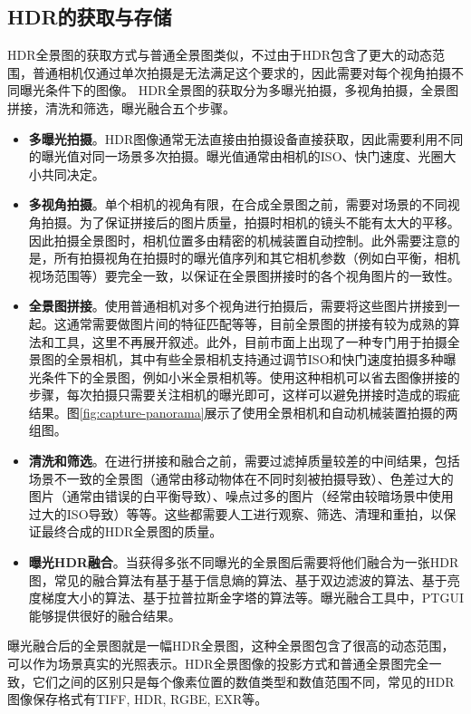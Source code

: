 \subsection{HDR的获取与存储}
HDR全景图的获取方式与普通全景图类似，不过由于HDR包含了更大的动态范围，普通相机仅通过单次拍摄是无法满足这个要求的，因此需要对每个视角拍摄不同曝光条件下的图像。
HDR全景图的获取分为多曝光拍摄，多视角拍摄，全景图拼接，清洗和筛选，曝光融合五个步骤。
\begin{itemize}
    \item \textbf{多曝光拍摄}。HDR图像通常无法直接由拍摄设备直接获取，因此需要利用不同的曝光值对同一场景多次拍摄。曝光值通常由相机的ISO、快门速度、光圈大小共同决定。
    \item \textbf{多视角拍摄}。单个相机的视角有限，在合成全景图之前，需要对场景的不同视角拍摄。为了保证拼接后的图片质量，拍摄时相机的镜头不能有太大的平移。因此拍摄全景图时，相机位置多由精密的机械装置自动控制。此外需要注意的是，所有拍摄视角在拍摄时的曝光值序列和其它相机参数（例如白平衡，相机视场范围等）要完全一致，以保证在全景图拼接时的各个视角图片的一致性。
    \item \textbf{全景图拼接}。使用普通相机对多个视角进行拍摄后，需要将这些图片拼接到一起。这通常需要做图片间的特征匹配等等，目前全景图的拼接有较为成熟的算法和工具，这里不再展开叙述。此外，目前市面上出现了一种专门用于拍摄全景图的全景相机，其中有些全景相机支持通过调节ISO和快门速度拍摄多种曝光条件下的全景图，例如小米全景相机\cite{xiaomi}等。使用这种相机可以省去图像拼接的步骤，每次拍摄只需要关注相机的曝光即可，这样可以避免拼接时造成的瑕疵结果。图\ref{fig:capture-panorama}展示了使用全景相机和自动机械装置拍摄的两组图。
    \item \textbf{清洗和筛选}。在进行拼接和融合之前，需要过滤掉质量较差的中间结果，包括场景不一致的全景图（通常由移动物体在不同时刻被拍摄导致）、色差过大的图片（通常由错误的白平衡导致）、噪点过多的图片（经常由较暗场景中使用过大的ISO导致）等等。这些都需要人工进行观察、筛选、清理和重拍，以保证最终合成的HDR全景图的质量。
    \item \textbf{曝光HDR融合}。当获得多张不同曝光的全景图后需要将他们融合为一张HDR图，常见的融合算法有基于基于信息熵的算法、基于双边滤波的算法、基于亮度梯度大小的算法、基于拉普拉斯金字塔的算法等。曝光融合工具中，PTGUI\cite{ptgui}能够提供很好的融合结果。
\end{itemize}


曝光融合后的全景图就是一幅HDR全景图，这种全景图包含了很高的动态范围，可以作为场景真实的光照表示。HDR全景图像的投影方式和普通全景图完全一致，它们之间的区别只是每个像素位置的数值类型和数值范围不同，常见的HDR图像保存格式有TIFF, HDR, RGBE, EXR等。


